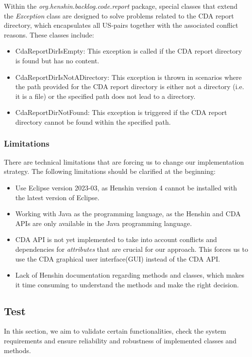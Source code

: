 Within the \textit{org.henshin.backlog.code.report} package, special classes that extend the \textit{Exception} class are designed to solve problems related to the CDA report directory, which encapsulates all US-pairs together with the associated conflict reasons. These classes include:
\begin{itemize}
	\item CdaReportDirIsEmpty: This exception is called if the CDA report directory is found but has no content.
	\item CdaReportDirIsNotADirectory: This exception is thrown in scenarios where the path provided for the CDA report directory is either not a directory (i.e. it is a file) or the specified path does not lead to a directory.
	\item CdaReportDirNotFound: This exception is triggered if the CDA report directory cannot be found within the specified path.
\end{itemize}
\subsubsection*{Limitations}
There are technical limitations that are forcing us to change our implementation strategy.
The following limitations should be clarified at the beginning:
\begin{itemize}
	\item Use Eclipse version 2023-03, as Henshin version 4 cannot be installed with the latest version of Eclipse.
	
	\item Working with Java as the programming language, as the Henshin and CDA APIs are only available in the Java programming language.
	
	\item CDA API is not yet implemented to take into account conflicts and dependencies for \textit{attributes} that are crucial for our approach. This forces us to use the CDA graphical user interface(GUI) instead of the CDA API.
	
	\item Lack of Henshin documentation regarding methods and classes, which makes it time consuming to understand the methods and make the right decision.
\end{itemize}
\subsection{Test}\label{redundancy_test}
In this section, we aim to validate certain functionalities, check the system requirements and ensure reliability and robustness of implemented classes and methods. 

